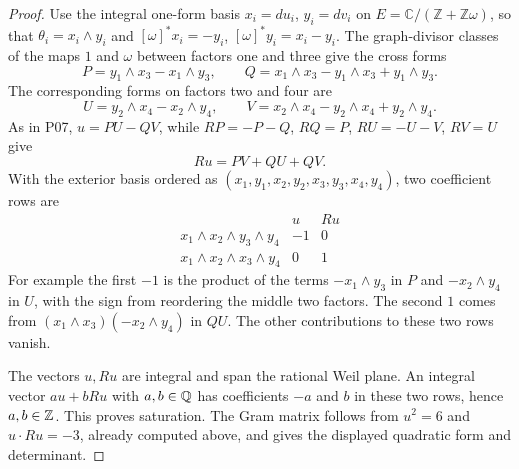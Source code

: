 \begin{proof}
Use the integral one-form basis $x_i=du_i$, $y_i=dv_i$ on
$E=\mathbb C/(\mathbb Z+\mathbb Z\omega)$, so that
$\theta_i=x_i\wedge y_i$ and
$[\omega]^*x_i=-y_i$, $[\omega]^*y_i=x_i-y_i$.
The graph-divisor classes of the maps $1$ and $\omega$ between factors
one and three give the cross forms
\[
 P=y_1\wedge x_3-x_1\wedge y_3,\qquad
 Q=x_1\wedge x_3-y_1\wedge x_3+y_1\wedge y_3.
\]
The corresponding forms on factors two and four are
\[
 U=y_2\wedge x_4-x_2\wedge y_4,\qquad
 V=x_2\wedge x_4-y_2\wedge x_4+y_2\wedge y_4.
\]
As in P07, $u=PU-QV$, while
$RP=-P-Q$, $RQ=P$, $RU=-U-V$, $RV=U$ give
\[
                       Ru=PV+QU+QV.
\]
With the exterior basis ordered as
$(x_1,y_1,x_2,y_2,x_3,y_3,x_4,y_4)$, two coefficient rows are
\[
\begin{array}{c|rr}
 &u&Ru\\ \hline
 x_1\wedge x_2\wedge y_3\wedge y_4&-1&0\\
 x_1\wedge x_2\wedge x_3\wedge y_4&0&1
\end{array}
\]
For example the first $-1$ is the product of the terms
$-x_1\wedge y_3$ in $P$ and $-x_2\wedge y_4$ in $U$,
with the sign from reordering the middle two factors. The second
$1$ comes from $(x_1\wedge x_3)(-x_2\wedge y_4)$ in $QU$.
The other contributions to these two rows vanish.

The vectors $u,Ru$ are integral and span the rational Weil plane.
An integral vector $a u+bRu$ with $a,b\in\mathbb Q$ has coefficients
$-a$ and $b$ in these two rows, hence $a,b\in\mathbb Z$. This proves
saturation. The Gram matrix follows from $u^2=6$ and
$u\cdot Ru=-3$, already computed above, and gives the displayed
quadratic form and determinant.
\end{proof}
